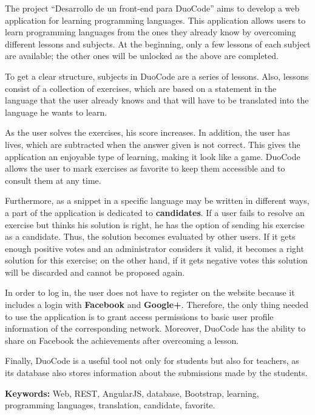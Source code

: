 The project ``Desarrollo de un front-end para DuoCode'' aims to develop a web application for learning programming languages. This application allows users to learn programming languages from the ones they already know by overcoming different lessons and subjects. At the beginning, only a few lessons of each subject are available; the other ones will be unlocked as the above are completed.

To get a clear structure, subjects in DuoCode are a series of lessons. Also, lessons consist of a collection of exercises, which are based on a statement in the language that the user already knows and that will have to be translated into the language he wants to learn.

As the user solves the exercises, his score increases. In addition, the user has lives, which are subtracted when the answer given is not correct. This gives the application an enjoyable type of learning, making it look like a game. DuoCode allows the user to mark exercises as favorite to keep them accessible and to consult them at any time. 

Furthermore, as a snippet in a specific language may be written in different ways, a part of the application is dedicated to \textbf{candidates}. If a user fails to resolve an exercise but thinks his solution is right, he has the option of sending his exercise as a candidate. Thus, the solution becomes evaluated by other users. If it gets enough positive votes and an administrator considers it valid, it becomes a right solution for this exercise; on the other hand, if it gets negative votes this solution will be discarded and cannot be proposed again.

In order to log in, the user does not have to register on the website because it includes a login with \textbf{Facebook} and \textbf{Google+}. Therefore, the only thing needed to use the application is to grant access permissions to basic user profile information of the corresponding network. Moreover, DuoCode has the ability to share on Facebook the achievements after overcoming a lesson.

Finally, DuoCode is a useful tool not only for students but also for teachers, as its database also stores information about the submissions made by the students.

\textbf{Keywords:} Web, REST, AngularJS, database, Bootstrap, learning, programming languages, translation, candidate, favorite.